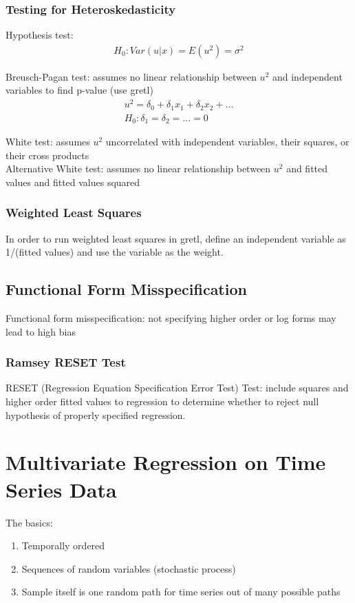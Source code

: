 \documentclass[12pt]{article}
\numberwithin{equation}{section}
\begin{document}
\subsubsection{Testing for Heteroskedasticity}
Hypothesis test:
\begin{gather}
    H_0 : Var(u|x) = E(u^2) = \sigma^2
\end{gather}

Breusch-Pagan test: assumes no linear relationship between $u^2$ and independent variables to find p-value (use gretl)
\begin{gather}
    u^2 = \delta_0 + \delta_1 x_1 + \delta_2 x_2 + ... \\
    H_0 : \delta_1 = \delta_2 = ... = 0
\end{gather}

White test: assumes $u^2$ uncorrelated with independent variables, their squares, or their cross products \\[0.5cm]
Alternative White test: assumes no linear relationship between $u^2$ and fitted values and fitted values squared

\subsubsection{Weighted Least Squares}
In order to run weighted least squares in gretl, define an independent variable as 1/(fitted values) and use the variable as the weight.

\subsection{Functional Form Misspecification}
Functional form misspecification: not specifying higher order or log forms may lead to high bias

\subsubsection{Ramsey RESET Test}
RESET (Regression Equation Specification Error Test) Test: include squares and higher order fitted values to regression to determine whether to reject null hypothesis of properly specified regression.

\section{Multivariate Regression on Time Series Data}

The basics:
\begin{enumerate}
    \item Temporally ordered
    \item Sequences of random variables (stochastic process)
    \item Sample itself is one random path for time series out of many possible paths
\end{enumerate}
\end{document}
